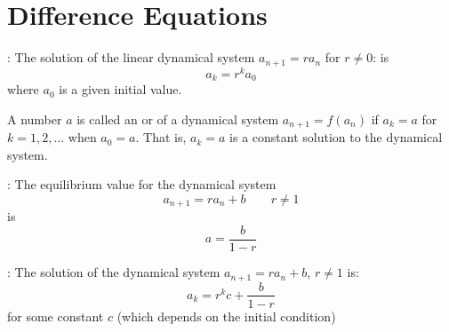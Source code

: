 \chapter{Difference Equations}

  \par {}: The solution of the linear dynamical system $a_{n + 1} = ra_{n}$ for $r \neq 0$: is
    \[
      a_k = r^k a_0
    \]
    where $a_0$ is a given initial value.
  \par A number $a$ is called an  or  of a dynamical system $a_{n + 1} = f(a_n)$ if $a_k = a$ for $k = 1, 2, \ldots$ when $a_{0} = a$. That is, $a_{k} = a$ is a constant solution to the dynamical system.
  \par {}: The equilibrium value for the dynamical system
  \[
    a_{n + 1} = r a_{n} + b \qquad r \neq 1
  \]
  is
  \[
    a = \frac{b}{1 - r}
  \]
  \par {}: The solution of the dynamical system $a_{n + 1} = ra_{n} + b$, $r \neq 1$ is:
  \[
    a_{k} = r^{k} c + \frac{b}{1 - r}
  \]
  for some constant $c$ (which depends on the initial condition)